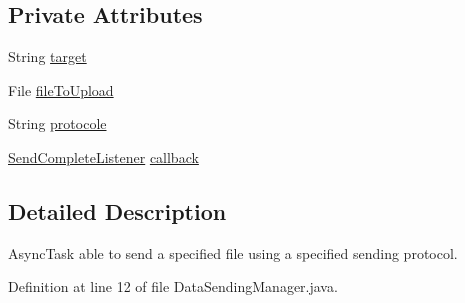 \subsection*{Private Attributes}
\begin{DoxyCompactItemize}
\item 
String \hyperlink{classcom_1_1qualoutdoor_1_1recorder_1_1network_1_1DataSendingManager_a374bd611a2fa799541bafdda13fb442b}{target}
\item 
File \hyperlink{classcom_1_1qualoutdoor_1_1recorder_1_1network_1_1DataSendingManager_a04c3eb72f14a6b304204d5995ebc47b5}{file\-To\-Upload}
\item 
String \hyperlink{classcom_1_1qualoutdoor_1_1recorder_1_1network_1_1DataSendingManager_a48eb8da2edfe089c9685e47b9450910e}{protocole}
\item 
\hyperlink{interfacecom_1_1qualoutdoor_1_1recorder_1_1network_1_1SendCompleteListener}{Send\-Complete\-Listener} \hyperlink{classcom_1_1qualoutdoor_1_1recorder_1_1network_1_1DataSendingManager_a6792b0b030b25ad8cc338196a3cd43cd}{callback}
\end{DoxyCompactItemize}


\subsection{Detailed Description}
Async\-Task able to send a specified file using a specified sending protocol. 

Definition at line 12 of file Data\-Sending\-Manager.\-java.



